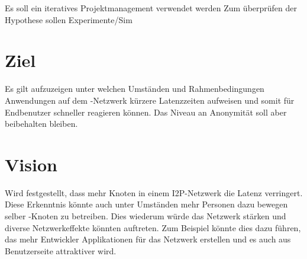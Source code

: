 Es soll ein iteratives Projektmanagement verwendet werden
Zum überprüfen der Hypothese sollen Experimente/Sim

\section{Ziel}

Es gilt aufzuzeigen unter welchen Umständen und Rahmenbedingungen Anwendungen auf dem -Netzwerk kürzere Latenzzeiten aufweisen
und somit für Endbenutzer schneller reagieren können. Das Niveau an Anonymität soll aber beibehalten bleiben.


\section{Vision}

Wird festgestellt, dass mehr Knoten in einem I2P-Netzwerk die Latenz verringert.
Diese Erkenntnis könnte auch unter Umständen mehr Personen dazu bewegen selber -Knoten zu betreiben.
Dies wiederum würde das Netzwerk stärken und diverse Netzwerkeffekte könnten auftreten.
Zum Beispiel könnte dies dazu führen, das mehr Entwickler Applikationen für das Netzwerk erstellen und es auch aus Benutzerseite attraktiver wird.


